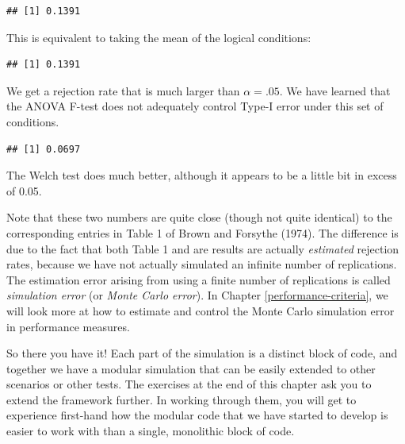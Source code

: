 \documentclass[
]{book}
\newenvironment{Shaded}{\begin{snugshade}}{\end{snugshade}}
\newcommand{\FloatTok}[1]{\textcolor[rgb]{0.00,0.00,0.81}{#1}}
\newcommand{\FunctionTok}[1]{\textcolor[rgb]{0.13,0.29,0.53}{\textbf{#1}}}
\newcommand{\NormalTok}[1]{#1}
\newcommand{\SpecialCharTok}[1]{\textcolor[rgb]{0.81,0.36,0.00}{\textbf{#1}}}
\begin{document}
\begin{verbatim}
## [1] 0.1391
\end{verbatim}

This is equivalent to taking the mean of the logical conditions:

\begin{Shaded}
\end{Shaded}

\begin{verbatim}
## [1] 0.1391
\end{verbatim}

We get a rejection rate that is much larger than \(\alpha = .05\).
We have learned that the ANOVA F-test does not adequately control Type-I error under this set of conditions.

\begin{Shaded}
\end{Shaded}

\begin{verbatim}
## [1] 0.0697
\end{verbatim}

The Welch test does much better, although it appears to be a little bit in excess of 0.05.

Note that these two numbers are quite close (though not quite identical) to the corresponding entries in Table 1 of Brown and Forsythe (1974). The difference is due to the fact that both Table 1 and are results are actually \emph{estimated} rejection rates, because we have not actually simulated an infinite number of replications. The estimation error arising from using a finite number of replications is called \emph{simulation error} (or \emph{Monte Carlo error}).
In Chapter \ref{performance-criteria}, we will look more at how to estimate and control the Monte Carlo simulation error in performance measures.

So there you have it! Each part of the simulation is a distinct block of code, and together we have a modular simulation that can be easily extended to other scenarios or other tests.
The exercises at the end of this chapter ask you to extend the framework further.
In working through them, you will get to experience first-hand how the modular code that we have started to develop is easier to work with than a single, monolithic block of code.
\end{document}
